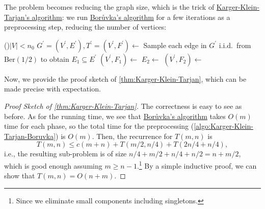 The problem becomes reducing the graph size, which is the trick of \hyperref[algo:Karger-Klein-Tarjan]{Karger-Klein-Tarjan's algorithm}: we run \hyperref[algo:Boruvka]{Borůvka's algorithm} for a few iterations as a preprocessing step, reducing the number of vertices:

\begin{algorithm}[H]\label{algo:Karger-Klein-Tarjan}
	\DontPrintSemicolon{}
	\caption{Karger-Klein-Tarjan's Algorithm~\cite{karger1995randomized}}
	\BlankLine
	\If(){\(\lvert V \rvert < n_0\)}{
	}
	\;
	\(G^{\prime} = (V^{\prime} , E^{\prime} ), T^{\prime} = (V^{\prime} , F^{\prime} )\gets\)\label{algo:Karger-Klein-Tarjan-Boruvka}
	\;
	Sample each edge in \(G^{\prime} \) i.i.d.\ from \(\mathrm{Ber} (1 / 2)\) to obtain \(E_1 \subseteq E^{\prime} \)\;
	\((V^{\prime} , F_1) \gets\)
	\(E_2 \gets\)
	\((V^{\prime} , F_2) \gets\)
	\;
\end{algorithm}

Now, we provide the proof sketch of \autoref{thm:Karger-Klein-Tarjan}, which can be made precise with expectation.

\begin{proof}[Proof Sketch of \autoref{thm:Karger-Klein-Tarjan}]
	The correctness is easy to see as before. As for the running time, we see that \hyperref[algo:Boruvka]{Borůvka's algorithm} takes \(O(m)\) time for each phase, so the total time for the preprocessing (\autoref{algo:Karger-Klein-Tarjan-Boruvka}) is \(O(m)\). Then, the recurrence for \(T(m, n)\) is
	\[
		T(m, n)
		\leq c(m+n) + T(m / 2, n / 4) + T(2n / 4 + n / 4),
	\]
	i.e., the resulting sub-problem is of size \(n / 4 + m / 2 + n / 4 + n / 2 = n + m / 2\), which is good enough assuming \(m \geq n - 1\).\footnote{Since we eliminate small components including singletons.} By a simple inductive proof, we can show that \(T(m, n) = O(n + m) \).
\end{proof}

